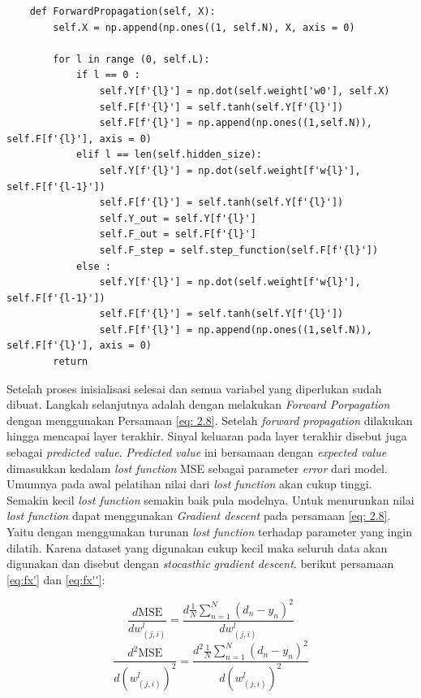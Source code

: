 \begin{lstlisting}
    def ForwardPropagation(self, X):
        self.X = np.append(np.ones((1, self.N), X, axis = 0)

        for l in range (0, self.L):
            if l == 0 :
                self.Y[f'{l}'] = np.dot(self.weight['w0'], self.X)
                self.F[f'{l}'] = self.tanh(self.Y[f'{l}'])
                self.F[f'{l}'] = np.append(np.ones((1,self.N)), self.F[f'{l}'], axis = 0)
            elif l == len(self.hidden_size):
                self.Y[f'{l}'] = np.dot(self.weight[f'w{l}'], self.F[f'{l-1}'])
                self.F[f'{l}'] = self.tanh(self.Y[f'{l}'])
                self.Y_out = self.Y[f'{l}']
                self.F_out = self.F[f'{l}']
                self.F_step = self.step_function(self.F[f'{l}'])
            else :
                self.Y[f'{l}'] = np.dot(self.weight[f'w{l}'], self.F[f'{l-1}'])
                self.F[f'{l}'] = self.tanh(self.Y[f'{l}'])
                self.F[f'{l}'] = np.append(np.ones((1,self.N)), self.F[f'{l}'], axis = 0)
        return
\end{lstlisting}

Setelah proses inisialisasi selesai dan semua variabel yang diperlukan sudah dibuat. Langkah selanjutnya adalah dengan melakukan \textit{Forward Porpagation} dengan menggunakan Persamaan \ref{eq: 2.8}. Setelah \textit{forward propagation} dilakukan hingga mencapai layer terakhir. Sinyal keluaran pada layer terakhir disebut juga sebagai \textit{predicted value}. \textit{Predicted value} ini bersamaan dengan \textit{expected value} dimasukkan kedalam \textit{lost function} MSE sebagai parameter \textit{error} dari model. Umumnya pada awal pelatihan nilai dari \textit{lost function} akan cukup tinggi. Semakin kecil \textit{lost function} semakin baik pula modelnya. Untuk menurunkan nilai \textit{lost function} dapat menggunakan \textit{Gradient descent} pada persamaan \ref{eq: 2.8}. Yaitu dengan menggunakan turunan \textit{lost function} terhadap parameter yang ingin dilatih. Karena dataset yang digunakan cukup kecil maka seluruh data akan digunakan dan disebut dengan \textit{stocasthic gradient descent}. berikut persamaan \ref{eq:fx'} dan \ref{eq:fx''}:

\begin{equation}
    \frac{d\text{MSE}}{dw^l_{(j,i)}}=\frac{d\frac{1}{N} \sum_{n=1}^{N} (d_n-y_n)^2}{dw^l_{(j,i)}}
    \label{eq:fx'}
\end{equation}
\begin{equation}
    \frac{d^2\text{MSE}}{d(w^l_{(j,i)})^2}=\frac{d^2\frac{1}{N} \sum_{n=1}^{N} (d_n-y_n)^2}{d(w^l_{(j,i)})^2}
    \label{eq:fx''}
\end{equation}

